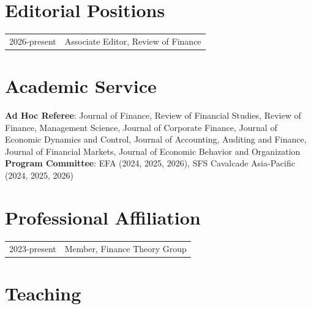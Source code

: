 \documentclass[11pt]{article}
\begin{document}
\section*{Editorial Positions}
\label{editor}

\renewcommand{\thefootnote}{\fnsymbol{footnote}}
\setcounter{footnote}{0}

\begin{longtable}[l]{@{}p{} p{}}
    2026-present & Associate Editor, Review of Finance \\
\end{longtable}


\section*{Academic Service}
\label{service}

\textbf{Ad Hoc Referee}: Journal of Finance, Review of Financial Studies, Review of Finance, Management Science, Journal of Corporate Finance, Journal of Economic Dynamics and Control, Journal of Accounting, Auditing and Finance, Journal of Financial Markets, Journal of Economic Behavior and Organization \\

\textbf{Program Committee}: EFA (2024, 2025, 2026), SFS Cavalcade Asia-Pacific (2024, 2025, 2026)


\section*{Professional Affiliation}

\renewcommand{\thefootnote}{\fnsymbol{footnote}}
\setcounter{footnote}{0}

\begin{longtable}[l]{@{}p{} p{}}
    2023-present & Member, Finance Theory Group \\
\end{longtable}


\section*{Teaching}
\label{teaching}
\end{document}
